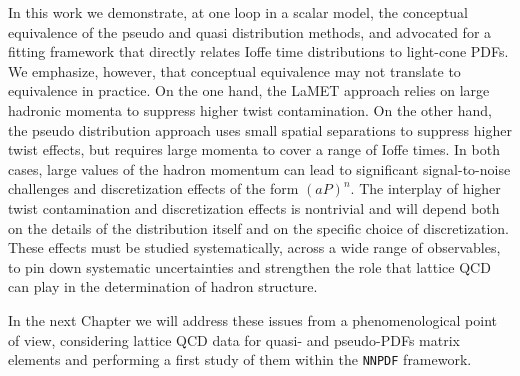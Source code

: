 In this work we demonstrate, at one loop in a scalar model, the conceptual
equivalence of the pseudo and quasi distribution methods, and advocated for a
fitting framework that directly relates Ioffe time distributions to light-cone
PDFs. We emphasize, however, that conceptual equivalence may not translate to
equivalence in practice. On the one hand, the LaMET approach relies on large
hadronic momenta to suppress higher twist contamination. On the other hand, the
pseudo distribution approach uses small spatial separations to suppress higher
twist effects, but requires large momenta to cover a range of Ioffe times. In
both cases, large values of the hadron momentum can lead to significant
signal-to-noise challenges and discretization effects of the form $(aP)^n$. The
interplay of higher twist contamination and discretization effects is nontrivial
and will depend both on the details of the distribution itself and on the
specific choice of discretization. These effects must be studied systematically,
across a wide range of observables, to pin down systematic uncertainties and
strengthen the role that lattice QCD can play in the determination of hadron
structure.

In the next Chapter we will address these issues from a phenomenological point of view,
considering lattice QCD data for quasi- and pseudo-PDFs matrix elements and 
performing a first study of them within the {\tt NNPDF} framework.

